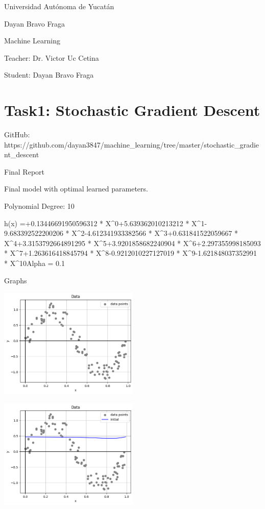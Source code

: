 \documentclass[11pt]{article}
\begin{document}
    Universidad Autónoma de Yucatán

    Dayan Bravo Fraga

    Machine Learning

    Teacher: Dr. Victor Uc Cetina

    Student: Dayan Bravo Fraga


    \section{Task1: Stochastic Gradient Descent}\enumer

    GitHub: https://github.com/dayan3847/machine_learning/tree/master/stochastic_gradient_descent

    Final Report

    Final model with optimal learned parameters.

    Polynomial Degree: 10

    h(x) =+0.13446691950596312 * X^0+5.639362010213212 * X^1-9.683392522200206 * X^2-4.612341933382566 * X^3+0.631841522059667 * X^4+3.3153792664891295 * X^5+3.9201858682240904 * X^6+2.297355998185093 * X^7+1.263616418845794 * X^8-0.9212010227127019 * X^9-1.621848037352991 * X^10Alpha = 0.1

    Graphs

    \includegraphics[width=0.5\textwidth]{../img/output1.png}

    \includegraphics[width=0.5\textwidth]{../img/output2.png}
\end{document}
